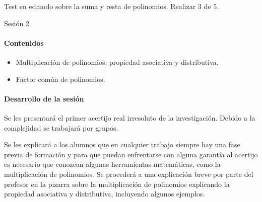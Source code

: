 \newbloq Test en edmodo sobre la suma y resta de polinomios. Realizar 3 de 5.









\newcommand{\numpreg}


\section{Sesión 2}



\paragraph{Contenidos}
\begin{itemize}
	\item Multiplicación de polinomios: propiedad asociativa y distributiva.
	\item Factor común de polinomios.
\end{itemize}

\paragraph{Desarrollo de la sesión}

Se les presentará el primer acertijo real irresoluto de la investigación.
%
Debido a la complejidad se trabajará por grupos.

Se les explicará a los alumnos que en cualquier trabajo siempre hay una fase previa de formación y para que puedan enfrentarse con alguna garantía al acertijo es necesario que conozcan algunas herramientas matemáticas, como la multiplicación de polinomios.
%
Se procederá a una explicación breve por parte del profesor en la pizarra sobre la multiplicación de polinomios explicando la propiedad asociativa y distributiva, incluyendo algunos ejemplos.

